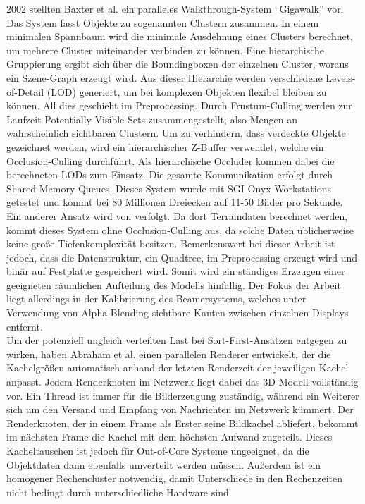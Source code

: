2002 stellten Baxter et al. \cite{baxter} ein paralleles Walkthrough-System "`Gigawalk"' vor. Das System fasst Objekte zu sogenannten Clustern zusammen. In einem minimalen Spannbaum wird die minimale Ausdehnung eines Clusters berechnet, um mehrere Cluster miteinander verbinden zu können. Eine hierarchische Gruppierung ergibt sich über die Boundingboxen der einzelnen Cluster, woraus ein Szene-Graph erzeugt wird. Aus dieser Hierarchie werden verschiedene Levels-of-Detail (LOD)\cite{hlod} generiert, um bei komplexen Objekten flexibel bleiben zu können. All dies geschieht im Preprocessing. Durch Frustum-Culling werden zur Laufzeit Potentially Visible Sets \cite{RTR3} zusammengestellt, also Mengen an wahrscheinlich sichtbaren Clustern. Um zu verhindern, dass verdeckte Objekte gezeichnet werden, wird ein hierarchischer Z-Buffer verwendet, welche ein Occlusion-Culling durchführt. Als hierarchische Occluder kommen dabei die berechneten LODs zum Einsatz. Die gesamte Kommunikation erfolgt durch Shared-Memory-Queues. Dieses System wurde mit SGI Onyx Workstations getestet und kommt bei 80 Millionen Dreiecken auf 11-50 Bilder pro Sekunde.\\
Ein anderer Ansatz wird von \cite{DBLP:journals/ijvr/YinJSZ06} verfolgt. Da dort Terraindaten berechnet werden, kommt dieses System ohne Occlusion-Culling aus, da solche Daten üblicherweise keine große Tiefenkomplexität besitzen. Bemerkenswert bei dieser Arbeit ist jedoch, dass die Datenstruktur, ein Quadtree, im Preprocessing erzeugt wird und binär auf Festplatte gespeichert wird. Somit wird ein ständiges Erzeugen einer geeigneten räumlichen Aufteilung des Modells hinfällig. Der Fokus der Arbeit liegt allerdings in der Kalibrierung des Beamersystems, welches unter Verwendung von Alpha-Blending sichtbare Kanten zwischen einzelnen Displays entfernt.\\
Um der potenziell ungleich verteilten Last bei Sort-First-Ansätzen entgegen zu wirken, haben Abraham et al. \cite{abraham} einen parallelen Renderer entwickelt, der die Kachelgrößen automatisch anhand der letzten Renderzeit der jeweiligen Kachel anpasst. Jedem Renderknoten im Netzwerk liegt dabei das 3D-Modell vollständig vor. Ein Thread ist immer für die Bilderzeugung zuständig, während ein Weiterer sich um den Versand und Empfang von Nachrichten im Netzwerk kümmert. Der Renderknoten, der in einem Frame als Erster seine Bildkachel abliefert, bekommt im nächsten Frame die Kachel mit dem höchsten Aufwand zugeteilt. Dieses Kacheltauschen ist jedoch für Out-of-Core Systeme ungeeignet, da die Objektdaten dann ebenfalls umverteilt werden müssen. Außerdem ist ein homogener Rechencluster notwendig, damit Unterschiede in den Rechenzeiten nicht bedingt durch unterschiedliche Hardware sind.

